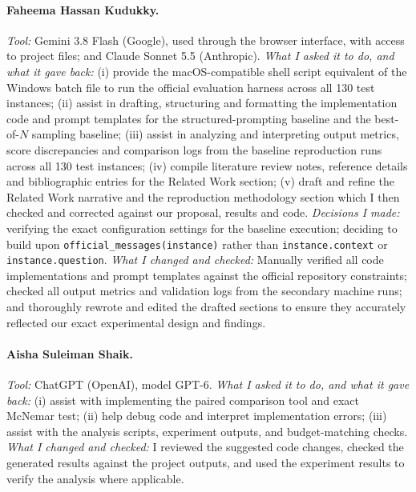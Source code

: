 \paragraph{Faheema Hassan Kudukky.}
\emph{Tool:} Gemini 3.8 Flash (Google), used through the browser interface, with access to project files; and Claude Sonnet 5.5 (Anthropic).
\emph{What I asked it to do, and what it gave back:}
(i) provide the macOS-compatible shell script equivalent of the Windows batch file to run the official 
evaluation harness across all 130 test instances;
(ii) assist in drafting, structuring and formatting the implementation code and prompt templates for 
the structured-prompting baseline and the best-of-$N$ sampling baseline;
(iii) assist in analyzing and interpreting output metrics, score discrepancies and comparison logs from 
the baseline reproduction runs across all 130 test instances;
(iv) compile literature review notes, reference details and bibliographic entries for the Related Work
 section;
(v) draft and refine the Related Work narrative and the reproduction methodology section which I then checked
and corrected against our proposal, results and code.
\emph{Decisions I made:} verifying the exact configuration settings for the baseline execution; deciding to build 
upon \texttt{official\_messages(instance)} rather than \texttt{instance.context} or \texttt{instance.question}.
\emph{What I changed and checked:} Manually verified all code implementations and prompt templates 
against the official repository constraints; checked all output metrics and validation logs from the 
secondary machine runs; and thoroughly rewrote and edited the drafted sections to ensure they accurately 
reflected our exact experimental design and findings.

\paragraph{Aisha Suleiman Shaik.}
\emph{Tool:} ChatGPT (OpenAI), model GPT-6.
\emph{What I asked it to do, and what it gave back:} (i) assist with implementing the paired comparison tool and exact McNemar test; (ii) help debug code and interpret implementation errors; (iii) assist with the analysis scripts, experiment outputs, and budget-matching checks.
\emph{What I changed and checked:} I reviewed the suggested code changes, checked the generated results against the project outputs, and used the experiment results to verify the analysis where applicable.
